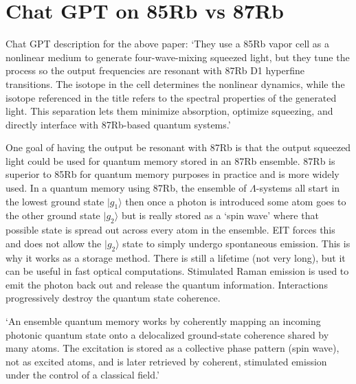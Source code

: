 \documentclass[aps,pra,twocolumn,showpacs,amsmath,amssymb,nofootinbib,longbibliography,superscriptaddress
]{revtex4-1}
\theoremstyle{definition}
\theoremstyle{remark}
\newcommand{\0}{\hat{0}}
\begin{document}
\section{Chat GPT on 85Rb vs 87Rb}

Chat GPT description for the above paper: `They use a 85Rb vapor cell as a nonlinear medium to generate four-wave-mixing squeezed light, but they tune the process so the output frequencies are resonant with 87Rb D1 hyperfine transitions. The isotope in the cell determines the nonlinear dynamics, while the isotope referenced in the title refers to the spectral properties of the generated light. This separation lets them minimize absorption, optimize squeezing, and directly interface with 87Rb-based quantum systems.'

One goal of having the output be resonant with 87Rb is that the output squeezed light could be used for quantum memory stored in an 87Rb ensemble. 87Rb is superior to 85Rb for quantum memory purposes in practice and is more widely used. In a quantum memory using 87Rb, the ensemble of $\Lambda$-systems all start in the lowest ground state $| g_1 \rangle$ then once a photon is introduced some atom goes to the other ground state $| g_2 \rangle$ but is really stored as a `spin wave' where that possible state is spread out across every atom in the ensemble. EIT forces this and does not allow the $| g_2 \rangle$ state to simply undergo spontaneous emission. This is why it works as a storage method. There is still a lifetime (not very long), but it can be useful in fast optical computations. Stimulated Raman emission is used to emit the photon back out and release the quantum information. Interactions progressively destroy the quantum state coherence.

`An ensemble quantum memory works by coherently mapping an incoming photonic quantum state onto a delocalized ground-state coherence shared by many atoms. The excitation is stored as a collective phase pattern (spin wave), not as excited atoms, and is later retrieved by coherent, stimulated emission under the control of a classical field.'
\end{document}
